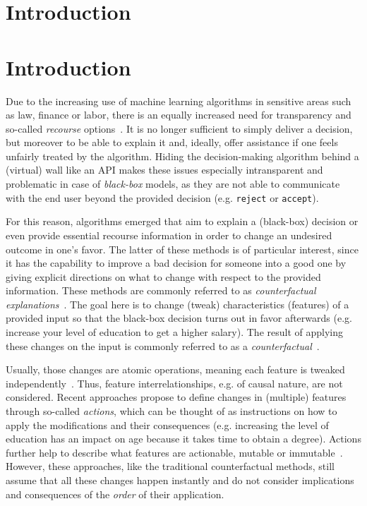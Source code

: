 \documentclass[runningheads, envcountsame, a4paper]{llncs}
\newcommand{\originalclass}{\texttt{reject}}
\newcommand{\targetclass}{\texttt{accept}}
\begin{document}
\section{Introduction}


\section{Introduction}
\label{sec:introduction}
Due to the increasing use of machine learning algorithms in sensitive areas such as law, finance or labor, there is an equally increased need for transparency and so-called \emph{recourse} options~\cite{wachterCounterfactualExplanationsOpening2017,karimiSurveyAlgorithmicRecourse2020}.
It is no longer sufficient to simply deliver a decision, but moreover to be able to explain it and, ideally, offer assistance if one feels unfairly treated by the algorithm.
Hiding the decision-making algorithm behind a (virtual) wall like an API makes these issues especially intransparent and problematic in case of \emph{black-box} models, as they are not able to communicate with the end user beyond the provided decision (e.g. \originalclass{} or \targetclass{}).

For this reason, algorithms emerged that aim to explain a (black-box) decision or even provide essential recourse information in order to change an undesired outcome in one's favor.
The latter of these methods is of particular interest, since it has the capability to improve a bad decision for someone into a good one by giving explicit directions on what to change with respect to the provided information. These methods are commonly referred to as \emph{counterfactual explanations}~\cite{wachterCounterfactualExplanationsOpening2017}. The goal here is to change (tweak) characteristics (features) of a provided input so that the black-box decision turns out in favor afterwards (e.g. increase your level of education to get a higher salary). The result of applying these changes on the input is commonly referred to as a \emph{counterfactual}~\cite{wachterCounterfactualExplanationsOpening2017}.

Usually, those changes are atomic operations, meaning each feature is tweaked independently~\cite{wachterCounterfactualExplanationsOpening2017,mothilalExplainingMachineLearning2020,dandlMultiObjectiveCounterfactualExplanations2020a,laugelComparisonBasedInverseClassification2018}. Thus, feature interrelationships, e.g. of causal nature, are not considered.
Recent approaches propose to define changes in (multiple) features through so-called \emph{actions}, which can be thought of as instructions on how to apply the modifications and their consequences (e.g. increasing the level of education has an impact on age because it takes time to obtain a degree).
Actions further help to describe what features are actionable, mutable or immutable~\cite{karimiSurveyAlgorithmicRecourse2020}. However, these approaches, like the traditional counterfactual methods, still assume that all these changes happen instantly and do not consider implications and consequences of the \emph{order} of their application.
\end{document}
